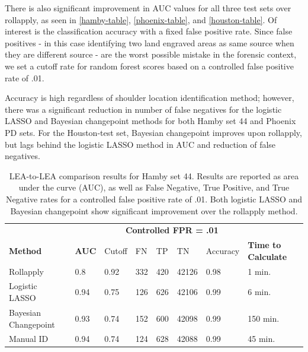 \documentclass[12pt]{article}
\begin{document}
There is also significant improvement in AUC values for all three test
sets over rollapply, as seen in \autoref{hamby-table},
\autoref{phoenix-table}, and \autoref{houston-table}. Of interest is the
classification accuracy with a fixed false positive rate. Since false
positives - in this case identifying two land engraved areas as same
source when they are different source - are the worst possible mistake
in the forensic context, we set a cutoff rate for random forest scores
based on a controlled false positive rate of .01.

Accuracy is high regardless of shoulder location identification method;
however, there was a significant reduction in number of false negatives
for the logistic LASSO and Bayesian changepoint methods for both Hamby
set 44 and Phoenix PD sets. For the Houston-test set, Bayesian
changepoint improves upon rollapply, but lags behind the logistic LASSO
method in AUC and reduction of false negatives.

\begin{table}[]
\centering
\begin{tabular}{llllllll}
& & \multicolumn{5}{c}{\textbf{Controlled FPR = .01}} & \\
\textbf{Method} & \textbf{AUC} & Cutoff & FN &TP & TN & Accuracy & \textbf{Time to Calculate} \\ \hline
Rollapply & 0.8 &  0.92 & 332 & 420&42126 & 0.98 & 1 min.\\ \hline
Logistic LASSO & 0.94 &  0.75 &126 &626 &42106 & 0.99 & 6 min. \\ \hline
Bayesian Changepoint & 0.93 &  0.74 &152 & 600&42098 & 0.99 & 150 min. \\ \hline
Manual ID & 0.94 & 0.74 & 124& 628&42088 & 0.99 & 45 min. \\ \hline 
\end{tabular}
\caption{LEA-to-LEA comparison results for Hamby set 44. Results are reported as area under the curve (AUC), as well as False Negative, True Positive, and True Negative rates for a controlled false positive rate of .01. Both logistic LASSO and Bayesian changepoint show significant improvement over the rollapply method.}
\label{hamby-table}
\end{table}
\end{document}
